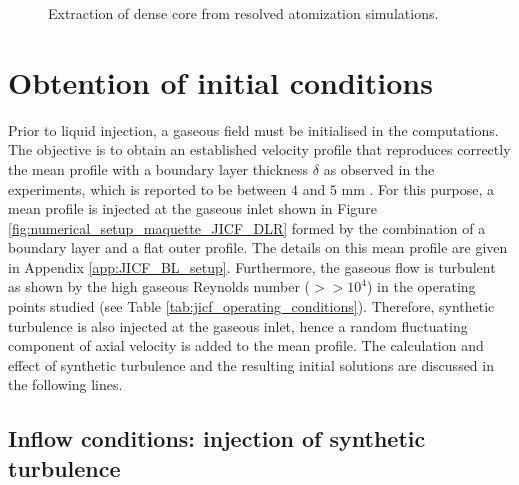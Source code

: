 \begin{figure}[ht]
     \centering
     \caption{Extraction of dense core from resolved atomization simulations.}
      \label{fig:dense_core_extraction}
\end{figure}




\section{Obtention of initial conditions}
\label{sec:ch5_initial_conditions}

Prior to liquid injection, a gaseous field must be initialised in the computations. The objective is to obtain an established velocity profile that reproduces correctly the mean profile with a boundary layer thickness $\delta$ as observed in the experiments, which is reported to be between $4$ and $5$ mm . For this purpose, a mean profile is injected at the gaseous inlet shown in Figure \ref{fig:numerical_setup_maquette_JICF_DLR} formed by the combination of a boundary layer and a flat outer profile. The details on this mean profile are given in Appendix \ref{app:JICF_BL_setup}. Furthermore, the gaseous flow is turbulent as shown by the high gaseous Reynolds number ($>> 10^4$) in the operating points studied (see Table \ref{tab:jicf_operating_conditions}). Therefore, synthetic turbulence is also injected at the gaseous inlet, hence a random fluctuating component of axial velocity is added to the mean profile. The calculation and effect of synthetic turbulence and the resulting initial solutions are discussed in the following lines.


\subsection{Inflow conditions: injection of synthetic turbulence}
\label{subsec:ch5_inflow_conditions_synthetic_turbulence}



